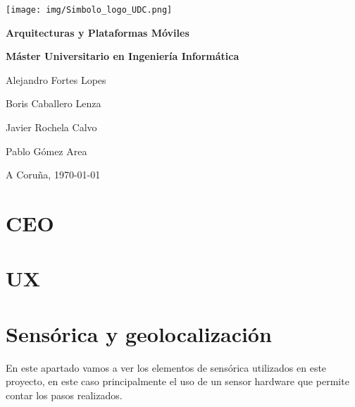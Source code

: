 \documentclass[12pt, a4paper, titlepage]{article}
\begin{document}
	\begin{titlepage}
	\texttt{[image: img/Simbolo\_logo\_UDC.png]}
	\vspace{6cm}
		\begin{center}
			\Huge{\textbf{Arquitecturas y Plataformas Móviles}}

			\large{\textbf{Máster Universitario en Ingeniería Informática}}

		\end{center}
		\vspace{10cm}
		\begin{flushright}

			Alejandro Fortes Lopes

			Boris Caballero Lenza

			Javier Rochela Calvo

			Pablo Gómez Area

		\end{flushright}

		\vspace{1cm}
		\begin{flushright}
			A Coruña, \today
		\end{flushright}


	\end{titlepage}

	\clearpage

	\tableofcontents

	\clearpage

	\section{CEO}

	\clearpage

	\section{UX}

	\clearpage

    \section{Sensórica y geolocalización}
		En este apartado vamos a ver los elementos de sensórica utilizados en este proyecto, en este caso principalmente el uso de un sensor hardware que permite contar los pasos realizados.
    	\newline
\end{document}
